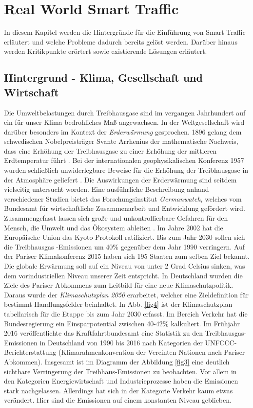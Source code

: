 \section{Real World Smart Traffic}
In diesem Kapitel werden die Hintergründe für die Einführung von Smart-Traffic erläutert und welche Probleme dadurch bereits gelöst werden. Darüber hinaus werden Kritikpunkte erörtert sowie existierende Lösungen erläutert.

\subsection{Hintergrund -  Klima, Gesellschaft und Wirtschaft}

Die Umweltbelastungen durch Treibhausgase sind im vergangen Jahrhundert auf ein für unser Klima bedrohliches Maß angewachsen. In der Weltgesellschaft wird darüber besonders im Kontext der \emph{Erderwärmung} gesprochen. 1896 gelang dem schwedischen Nobelpreisträger Svante Arrhenius der mathematische Nachweis, dass eine Erhöhung der Treibhausgase zu einer Erhöhung der mittleren Erdtemperatur führt \citep[vgl.][]{SvanteArrhenius.1896}. Bei der internationalen geophysikalischen Konferenz 1957 wurden schließlich unwiderlegbare Beweise für die Erhöhung der Treibhausgase in der Atmosphäre geliefert \citep[vgl.][]{Rahmstorf.2007}. Die Auswirkungen der Erderwärmung sind seitdem vielseitig untersucht worden. Eine ausführliche Beschreibung anhand verschiedener Studien bietet das Forschungsinstitut \emph{Germanwatch}, welches vom Bundesamt für wirtschaftliche Zusammenarbeit und Entwicklung gefördert wird. Zusammengefasst lassen sich große und unkontrollierbare Gefahren für den Mensch, die Umwelt und das Ökosystem ableiten \citep{Rothenbucher.2011,Eis.2010}. Im Jahre 2002 hat die Europäische Union das Kyoto-Protokoll ratifiziert. Bis zum Jahr 2030 sollen sich die Treibhausgas -Emissionen um 40\% gegenüber dem Jahr 1990 verringern. Auf der Pariser Klimakonferenz 2015 haben sich 195 Staaten zum selben Ziel bekannt. Die globale Erwärmung soll auf ein Niveau von unter 2 Grad Celsius sinken, was dem vorindustriellen Niveau unserer Zeit entspricht. In Deutschland wurden die Ziele des Pariser Abkommens zum Leitbild für eine neue Klimaschutzpolitik. Daraus wurde der \emph{Klimaschutzplan 2050} erarbeitet, welcher eine Zieldefinition für bestimmt Handlungsfelder beinhaltet. In Abb. \ref{fig4} ist der Klimaschutzplan tabellarisch für die Etappe bis zum Jahr 2030 erfasst. Im Bereich Verkehr hat die Bundesregierung ein Einsparpotential zwischen 40-42\% kalkuliert. Im Frühjahr 2016 veröffentlichte das Kraftfahrtbundesamt eine Statistik zu den Treibhausgas-Emissionen in Deutschland von 1990 bis 2016 nach Kategorien der UNFCCC-Berichterstattung (Klimarahmenkonvention der Vereinten Nationen nach Pariser Abkommen). Insgesamt ist im Diagramm der Abbildung \ref{fig3} eine deutlich sichtbare Verringerung der Treibhaus-Emissionen zu beobachten. Vor allem in den Kategorien Energiewirtschaft und Industrieprozesse haben die Emissionen stark nachgelassen. Allerdings hat sich in der Kategorie Verkehr  kaum etwas verändert. Hier sind die Emissionen auf einem konstanten Niveau geblieben. 

